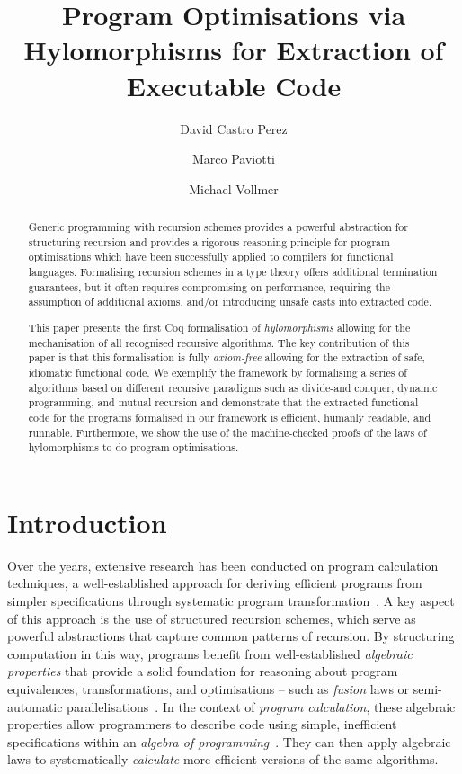 \documentclass[a4paper,UKenglish,cleveref, autoref, thm-restate]{lipics-v2021}
\title{Program Optimisations via Hylomorphisms for Extraction of Executable Code}
\author{David {Castro Perez}}%
{University Of Kent, Canterbury, CT2 7NZ, United Kingdom}%
{D.Castro-Perez@kent.ac.uk}%
{0000-0002-6939-4189}%
{}
\author{Marco Paviotti}%
{University Of Kent, Canterbury, CT2 7NZ, United Kingdom}%
{M.Paviotti@kent.ac.uk}%
{0000-0002-1513-0807}%
{}
\author{Michael Vollmer}%
{University Of Kent, Canterbury, CT2 7NZ, United Kingdom}%
{M.Vollmer@kent.ac.uk}%
{0000-0002-0496-8268}%
{}
\begin{document}
\maketitle

\begin{abstract}
  Generic programming with recursion schemes provides a powerful abstraction for
  structuring recursion and provides a rigorous reasoning principle for program
  optimisations which have been successfully applied to compilers for functional
  languages. Formalising recursion schemes in a type theory offers additional
  termination guarantees, but it often requires compromising on performance,
  requiring the assumption of additional axioms, and/or introducing unsafe casts
  into extracted code.

  This paper presents the first Coq formalisation of \emph{hylomorphisms}
  allowing for the mechanisation of all recognised recursive algorithms. The key
  contribution of this paper is that this formalisation is fully
  \emph{axiom-free} allowing for the extraction of safe, idiomatic functional
  code. We exemplify the framework by formalising a series of algorithms based
  on different recursive paradigms such as divide-and conquer, dynamic
  programming, and mutual recursion and demonstrate that the extracted
  functional code for the programs formalised in our framework is efficient,
  humanly readable, and runnable. Furthermore, we show the use of the
  machine-checked proofs of the laws of hylomorphisms to do program
  optimisations.
\end{abstract}

\section{Introduction}
\label{sec:intro}
Over the years, extensive research has been conducted on program calculation
techniques, a well-established approach for deriving efficient programs from
simpler specifications through systematic program
transformation~\cite{gibbonsSquiggol, BirddeMoor96:Algebra}. A key aspect of
this approach is the use of structured recursion schemes, which serve as
powerful abstractions that capture common patterns of recursion. By structuring
computation in this way, programs benefit from well-established \emph{algebraic
properties} that provide a solid foundation for reasoning about program
equivalences, transformations, and optimisations -- such as \emph{fusion} laws or
semi-automatic parallelisations~\cite{TakanoM95,Gibbons96:Third,Morihata09:Third,farmsCastro}.
In the context of \emph{program calculation}, these algebraic properties allow
programmers to describe code using simple, inefficient specifications within an
\emph{algebra of programming}~\cite{BirddeMoor96:Algebra}. They can then apply
algebraic laws to systematically \emph{calculate} more efficient versions of the
same algorithms.
\end{document}
